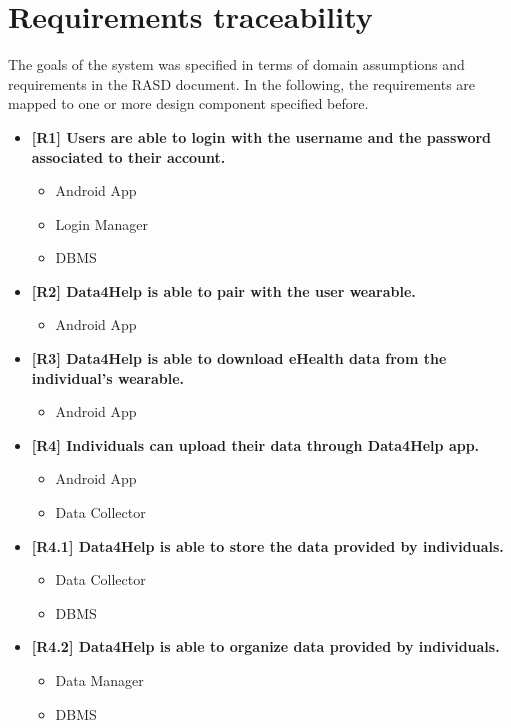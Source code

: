 \chapter{Requirements traceability}

The goals of the system was specified in terms of domain assumptions and requirements in the RASD document.
In the following, the requirements are mapped to one or more design component specified before.

\begin{itemize}
\item \textbf{[R1] Users are able to login with the username and the password associated to
their account. }  
\begin{itemize}
\item Android App
\item Login Manager
\item DBMS
\end{itemize}

\item \textbf{[R2] Data4Help is able to pair with the user wearable.}
\begin{itemize}
\item Android App
\end{itemize}

\item \textbf{[R3] Data4Help is able to download eHealth data from the individual’s wearable.}
\begin{itemize}
\item Android App
\end{itemize}

\item \textbf{[R4] Individuals can upload their data through Data4Help app.}
\begin{itemize}
\item Android App
\item Data Collector
\end{itemize}

\item \textbf{[R4.1] Data4Help is able to store the data provided by individuals.}
\begin{itemize}
\item Data Collector
\item DBMS
\end{itemize}

\item \textbf{[R4.2] Data4Help is able to organize data provided by individuals.}
\begin{itemize}
\item Data Manager
\item DBMS
\end{itemize}


\end{itemize}
